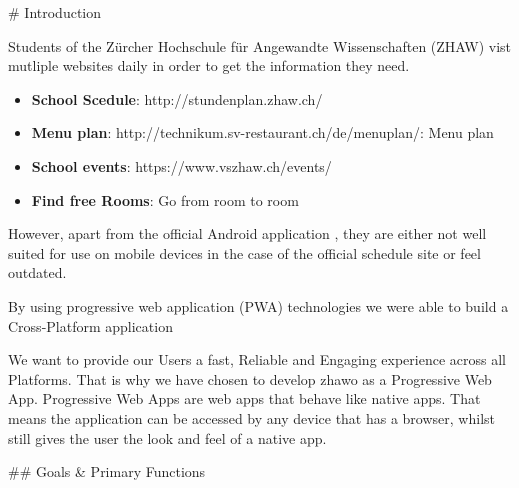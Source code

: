 \begin{markdown}

# Introduction

Students of the Zürcher Hochschule für Angewandte Wissenschaften (ZHAW) vist mutliple websites daily in order to get the information they need.

\begin{itemize}
  \item \textbf{School Scedule}: http://stundenplan.zhaw.ch/
  \item \textbf{Menu plan}: http://technikum.sv-restaurant.ch/de/menuplan/: Menu plan
  \item \textbf{School events}: https://www.vszhaw.ch/events/
  \item \textbf{Find free Rooms}: Go from room to room
\end{itemize}


However, apart from the official Android application \cite{DUMMY}, they are either not well suited for use on mobile devices in the case of the official schedule site \cite{DUMMY} or feel outdated.



By using progressive web application (PWA) technologies \cite{OurReadme} we were able to build a Cross-Platform application

We want to provide our Users a fast, Reliable and Engaging experience across all Platforms. That is why we have chosen to develop zhawo as a Progressive Web App. Progressive Web Apps are web apps that behave like native apps. That means the application can be accessed by any device that has a browser, whilst still gives the user the look and feel of a native app.



## Goals & Primary Functions


\end{markdown}
